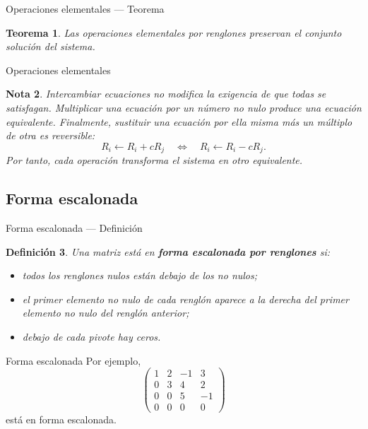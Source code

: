 \documentclass[aspectratio=169,11pt]{beamer}
\newtheorem{definicion}{Definición}[section]
\newtheorem{teorema}[definicion]{Teorema}
\newtheorem{Nota}[definicion]{Nota}
\theoremstyle{remark}
\begin{document}
\begin{frame}[shrink=5]{Operaciones elementales — Teorema}
\footnotesize
\begin{teorema}
Las operaciones elementales por renglones preservan el conjunto solución del sistema.
\end{teorema}
\end{frame}

\begin{frame}[shrink=5]{Operaciones elementales}
\footnotesize
\begin{Nota}
Intercambiar ecuaciones no modifica la exigencia de que todas se satisfagan. Multiplicar una ecuación
por un número no nulo produce una ecuación equivalente. Finalmente, sustituir una ecuación por ella
misma más un múltiplo de otra es reversible:
\[
R_i\leftarrow R_i+cR_j
\quad\Longleftrightarrow\quad
R_i\leftarrow R_i-cR_j.
\]
Por tanto, cada operación transforma el sistema en otro equivalente.
\end{Nota}
\end{frame}

\subsection*{Forma escalonada}
\begin{frame}[shrink=5]{Forma escalonada — Definición}
\footnotesize
\begin{definicion}
Una matriz está en \textbf{forma escalonada por renglones} si:
\begin{itemize}
\item todos los renglones nulos están debajo de los no nulos;
\item el primer elemento no nulo de cada renglón aparece a la derecha del primer elemento no nulo
del renglón anterior;
\item debajo de cada pivote hay ceros.
\end{itemize}
\end{definicion}
\end{frame}

\begin{frame}[allowframebreaks]{Forma escalonada}
\footnotesize
Por ejemplo,
\[
\begin{pmatrix}
1&2&-1&3\\
0&3&4&2\\
0&0&5&-1\\
0&0&0&0
\end{pmatrix}
\]
está en forma escalonada.
\end{frame}
\end{document}
